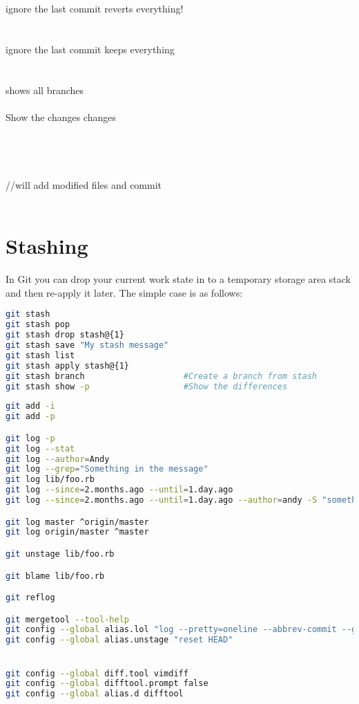 \\\\
ignore the last commit reverts everything!\\
\\\\
ignore the last commit keeps everything\\
\\\\
shows all branches
\\\\
Show the changes changes
\\\\
\\\\
\\
 //will add modified files and commit\\
\\

\section{Stashing}

In Git you can drop your current work state in to a temporary storage area stack and then re-apply it later. The simple case is as follows:

\begin{lstlisting}[language=sh,style=mysh]
git stash
git stash pop
git stash drop stash@{1}
git stash save "My stash message"
git stash list
git stash apply stash@{1}
git stash branch					#Create a branch from stash
git stash show -p					#Show the differences
\end{lstlisting}

\begin{lstlisting}[language=sh,style=mysh]
git add -i
git add -p

git log -p
git log --stat
git log --author=Andy
git log --grep="Something in the message"
git log lib/foo.rb
git log --since=2.months.ago --until=1.day.ago
git log --since=2.months.ago --until=1.day.ago --author=andy -S "something" --all-match

git log master ^origin/master
git log origin/master ^master

git unstage lib/foo.rb

git blame lib/foo.rb

git reflog

git mergetool --tool-help 
git config --global alias.lol "log --pretty=oneline --abbrev-commit --graph --decorate"
git config --global alias.unstage "reset HEAD"


git config --global diff.tool vimdiff
git config --global difftool.prompt false
git config --global alias.d difftool
\end{lstlisting}

